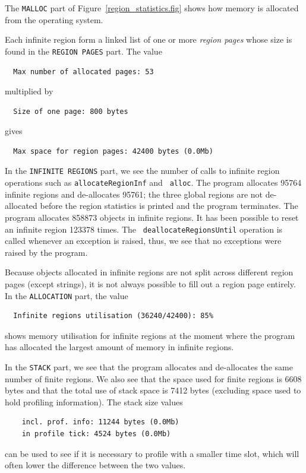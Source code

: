 \documentclass[12pt]{book}
\begin{document}
The {\tt MALLOC} part of Figure~\ref{region_statistics.fig} shows how
memory is allocated from the operating system.

Each infinite region form a linked list of one or more
% 
{\em region pages\/} whose size is found in the {\tt REGION PAGES}
part. The value
\begin{verbatim}
  Max number of allocated pages: 53
\end{verbatim}
multiplied by
\begin{verbatim}
  Size of one page: 800 bytes
\end{verbatim}
gives 
\begin{verbatim}
  Max space for region pages: 42400 bytes (0.0Mb)
\end{verbatim}

In the {\tt INFINITE REGIONS} part, we see the number of calls to
infinite region operations such as {\tt allocateRegionInf} and {\tt
  alloc}. The program allocates 95764 infinite regions and
de-allocates 95761; the three global regions are not de-allocated
before the region statistics is printed and the program terminates.
The program allocates 858873 objects in infinite regions. It has
been possible to reset an infinite region 123378 times. The {\tt
  deallocateRegionsUntil} operation is called whenever an exception is
raised, thus, we see that no exceptions were raised by the program.

Because objects allocated in infinite regions are not split across
different region pages (except strings), it is not always possible to
fill out a region page entirely. In the {\tt ALLOCATION} part, the value
\begin{verbatim}
  Infinite regions utilisation (36240/42400): 85%
\end{verbatim}
shows memory utilisation for infinite regions at the moment where the
program has allocated the largest amount of memory in infinite
regions.

In the {\tt STACK} part, we see that the program allocates and
de-allocates the same number of finite regions. We also see that the
space used for finite regions is 6608 bytes and that the total use of
stack space is 7412 bytes (excluding space used to hold profiling
information). The stack size values
\begin{verbatim}
    incl. prof. info: 11244 bytes (0.0Mb)
    in profile tick: 4524 bytes (0.0Mb)
\end{verbatim}
can be used to see if it is necessary to profile with a smaller time
slot, which will often lower the difference between the two values.
\end{document}
